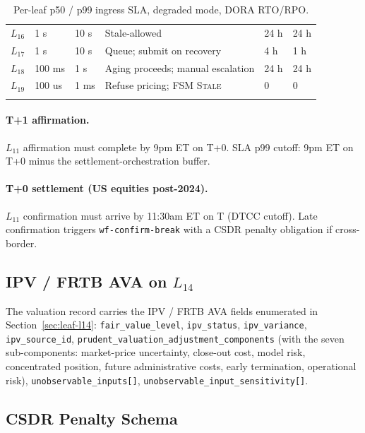 \documentclass[11pt,a4paper]{article}
\begin{document}
\begin{center}
\begin{longtable}{@{}p{1.0cm}p{1.6cm}p{1.6cm}p{6.0cm}p{1.4cm}p{1.4cm}@{}}
$L_{16}$ & 1 s    & 10 s   & Stale-allowed                                        & 24 h & 24 h \\
$L_{17}$ & 1 s    & 10 s   & Queue; submit on recovery                            & 4 h  & 1 h  \\
$L_{18}$ & 100 ms & 1 s    & Aging proceeds; manual escalation                    & 24 h & 24 h \\
$L_{19}$ & 100 us & 1 ms   & Refuse pricing; FSM \textsc{Stale}                  & 0    & 0    \\
\caption{Per-leaf p50 / p99 ingress SLA, degraded mode, DORA RTO/RPO.}
\label{tab:sla}
\end{longtable}
\end{center}

\paragraph{T+1 affirmation.} $L_{11}$ affirmation must complete by 9pm ET on T+0. SLA p99 cutoff: 9pm ET on T+0 minus the settlement-orchestration buffer.

\paragraph{T+0 settlement (US equities post-2024).} $L_{11}$ confirmation must arrive by 11:30am ET on T (DTCC cutoff). Late confirmation triggers \texttt{wf-confirm-break} with a CSDR penalty obligation if cross-border.

\subsection{IPV / FRTB AVA on $L_{14}$}
\label{sec:operational-ipv}

The valuation record carries the IPV / FRTB AVA fields enumerated in Section~\ref{sec:leaf-l14}: \texttt{fair\_value\_level}, \texttt{ipv\_status}, \texttt{ipv\_variance}, \texttt{ipv\_source\_id}, \texttt{prudent\_valuation\_adjustment\_components} (with the seven sub-components: market-price uncertainty, close-out cost, model risk, concentrated position, future administrative costs, early termination, operational risk), \texttt{unobservable\_inputs[]}, \texttt{unobservable\_input\_sensitivity[]}.

\subsection{CSDR Penalty Schema}
\label{sec:operational-csdr}
\end{document}
